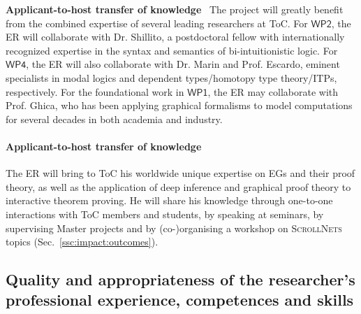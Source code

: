 \documentclass[12pt,draftproposal]{msca-pf}
\newcommand{\proj}{\small\textsc{ScrollNets}}
\newcommand{\WP}[1]{$\mathsf{WP#1}$}
\begin{document}
\textbf{Applicant-to-host transfer of knowledge}~ The project will greatly benefit from the combined
expertise of several leading researchers at ToC. For \WP{2}, the ER will collaborate with Dr.
Shillito, a postdoctoral fellow with internationally recognized expertise in the syntax and
semantics of bi-intuitionistic logic. For \WP{4}, the ER will also collaborate with Dr. Marin and
Prof. Escardo, eminent specialists in modal logics and dependent types/homotopy type theory/ITPs,
respectively. For the foundational work in \WP{1}, the ER may collaborate with Prof. Ghica, who has
been applying graphical formalisms to model computations for several decades in both academia and
industry.

\paragraph{Applicant-to-host transfer of knowledge}
The ER will bring to ToC his worldwide unique expertise on EGs and their proof theory, as well as
the application of deep inference and graphical proof theory to interactive theorem proving. He will
share his knowledge through one-to-one interactions with ToC members and students, by speaking at
seminars, by supervising Master projects and by (co-)organising a workshop on {\proj} topics
(Sec.~\ref{ssc:impact:outcomes}).

\subsection{Quality and appropriateness of the researcher's professional
    experience, competences and skills}
\label{ssc:excellence:researcher}
\end{document}
